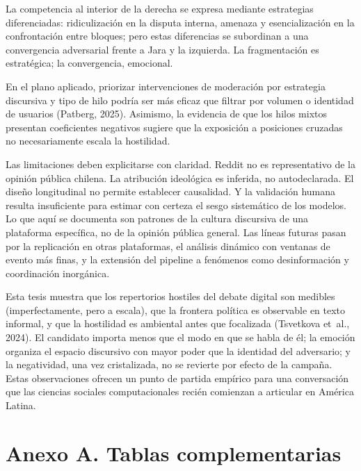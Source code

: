 \documentclass[
  letterpaper,
  numbers=noendperiod,
  fontsize=11pt,
  DIV=12,
  titlepage=false]{scrreprt}
\begin{document}
La competencia al interior de la derecha se expresa mediante estrategias
diferenciadas: ridiculización en la disputa interna, amenaza y
esencialización en la confrontación entre bloques; pero estas
diferencias se subordinan a una convergencia adversarial frente a Jara y
la izquierda. La fragmentación es estratégica; la convergencia,
emocional.

En el plano aplicado, priorizar intervenciones de moderación por
estrategia discursiva y tipo de hilo podría ser más eficaz que filtrar
por volumen o identidad de usuarios (Patberg, 2025). Asimismo, la
evidencia de que los hilos mixtos presentan coeficientes negativos
sugiere que la exposición a posiciones cruzadas no necesariamente escala
la hostilidad.

Las limitaciones deben explicitarse con claridad. Reddit no es
representativo de la opinión pública chilena. La atribución ideológica
es inferida, no autodeclarada. El diseño longitudinal no permite
establecer causalidad. Y la validación humana resulta insuficiente para
estimar con certeza el sesgo sistemático de los modelos. Lo que aquí se
documenta son patrones de la cultura discursiva de una plataforma
específica, no de la opinión pública general. Las líneas futuras pasan
por la replicación en otras plataformas, el análisis dinámico con
ventanas de evento más finas, y la extensión del pipeline a fenómenos
como desinformación y coordinación inorgánica.

Esta tesis muestra que los repertorios hostiles del debate digital son
medibles (imperfectamente, pero a escala), que la frontera política es
observable en texto informal, y que la hostilidad es ambiental antes que
focalizada (Tsvetkova et~al., 2024). El candidato importa menos que el
modo en que se habla de él; la emoción organiza el espacio discursivo
con mayor poder que la identidad del adversario; y la negatividad, una
vez cristalizada, no se revierte por efecto de la campaña. Estas
observaciones ofrecen un punto de partida empírico para una conversación
que las ciencias sociales computacionales recién comienzan a articular
en América Latina.

\clearpage


\chapter{Anexo A. Tablas
complementarias}\label{anexo-a.-tablas-complementarias}
\end{document}
